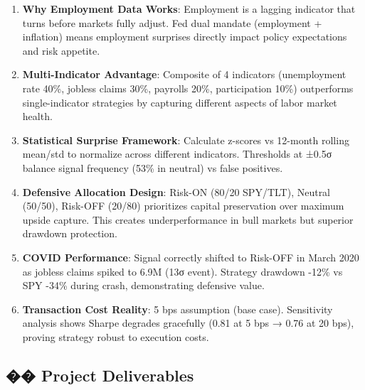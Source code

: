 \documentclass[12pt,a4paper]{article}
\begin{document}
\begin{enumerate}
    \item \textbf{Why Employment Data Works}: Employment is a lagging indicator that turns before markets fully adjust. Fed dual mandate (employment + inflation) means employment surprises directly impact policy expectations and risk appetite.

    \item \textbf{Multi-Indicator Advantage}: Composite of 4 indicators (unemployment rate 40\%, jobless claims 30\%, payrolls 20\%, participation 10\%) outperforms single-indicator strategies by capturing different aspects of labor market health.

    \item \textbf{Statistical Surprise Framework}: Calculate z-scores vs 12-month rolling mean/std to normalize across different indicators. Thresholds at ±0.5σ balance signal frequency (53\% in neutral) vs false positives.

    \item \textbf{Defensive Allocation Design}: Risk-ON (80/20 SPY/TLT), Neutral (50/50), Risk-OFF (20/80) prioritizes capital preservation over maximum upside capture. This creates underperformance in bull markets but superior drawdown protection.

    \item \textbf{COVID Performance}: Signal correctly shifted to Risk-OFF in March 2020 as jobless claims spiked to 6.9M (13σ event). Strategy drawdown -12\% vs SPY -34\% during crash, demonstrating defensive value.

    \item \textbf{Transaction Cost Reality}: 5 bps assumption (base case). Sensitivity analysis shows Sharpe degrades gracefully (0.81 at 5 bps → 0.76 at 20 bps), proving strategy robust to execution costs.
\end{enumerate}

\subsection*{�� Project Deliverables}
\end{document}
